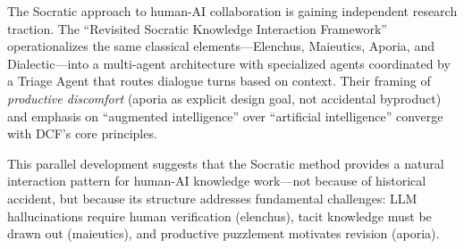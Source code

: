 The Socratic approach to human-AI collaboration is gaining independent research traction. The ``Revisited Socratic Knowledge Interaction Framework'' \cite{tonekaboni2026socratic} operationalizes the same classical elements---Elenchus, Maieutics, Aporia, and Dialectic---into a multi-agent architecture with specialized agents coordinated by a Triage Agent that routes dialogue turns based on context. Their framing of \emph{productive discomfort} (aporia as explicit design goal, not accidental byproduct) and emphasis on ``augmented intelligence'' over ``artificial intelligence'' converge with DCF's core principles.

This parallel development suggests that the Socratic method provides a natural interaction pattern for human-AI knowledge work---not because of historical accident, but because its structure addresses fundamental challenges: LLM hallucinations require human verification (elenchus), tacit knowledge must be drawn out (maieutics), and productive puzzlement motivates revision (aporia).

